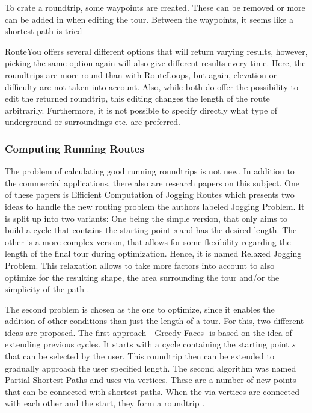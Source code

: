 To crate a roundtrip, some \glqq waypoints\grqq{} are created. 
These can be removed or more can be added in when editing the tour.
Between the waypoints, it seems like a shortest path is tried 

RouteYou offers several different options that will return varying results, however, picking the same option again will also give different results every time.   
Here, the roundtrips are more round than with RouteLoops, but again, elevation or difficulty are not taken into account. 
Also, while both do offer the possibility to edit the returned roundtrip, this editing changes the length of the route arbitrarily.
Furthermore, it is not possible to specify directly what type of underground or surroundings etc. are preferred. 

\subsubsection{Computing Running Routes}
\label{subsubsec:runningRoutes}

The problem of calculating good running roundtrips is not new.
In addition to the commercial applications, there also are research papers on this subject.
One of these papers is \glqq Efficient Computation of Jogging Routes\grqq \cite{gemsa_efficient_2013} which presents two ideas to handle the new routing problem the authors labeled \glqq Jogging Problem\grqq .
It is split up into two variants: 
One being the simple version, that only aims to build a cycle that contains the starting point \textit{s} and has the desired length.
The other is a more complex version, that allows for some flexibility regarding the length of the final tour during optimization. 
Hence, it is named \glqq Relaxed Jogging Problem\grqq . 
This relaxation allows to take more factors into account to also optimize for the resulting shape, the area surrounding the tour and/or the simplicity of the path \cite{gemsa_efficient_2013}. 

The second problem is chosen as the one to optimize, since it enables the addition of other conditions than just the length of a tour.
For this, two different ideas are proposed.
The first approach - \glqq Greedy Faces\grqq - is based on the idea of extending previous cycles.
It starts with a cycle containing the starting point \textit{s} that can be selected by the user. 
This roundtrip then can be extended to gradually approach the user specified length. 
The second algorithm was named \glqq Partial Shortest Paths\grqq{} and uses via-vertices.
These are a number of new points that can be connected with shortest paths.
When the via-vertices are connected with each other and the start, they form a roundtrip \cite{gemsa_efficient_2013}.



